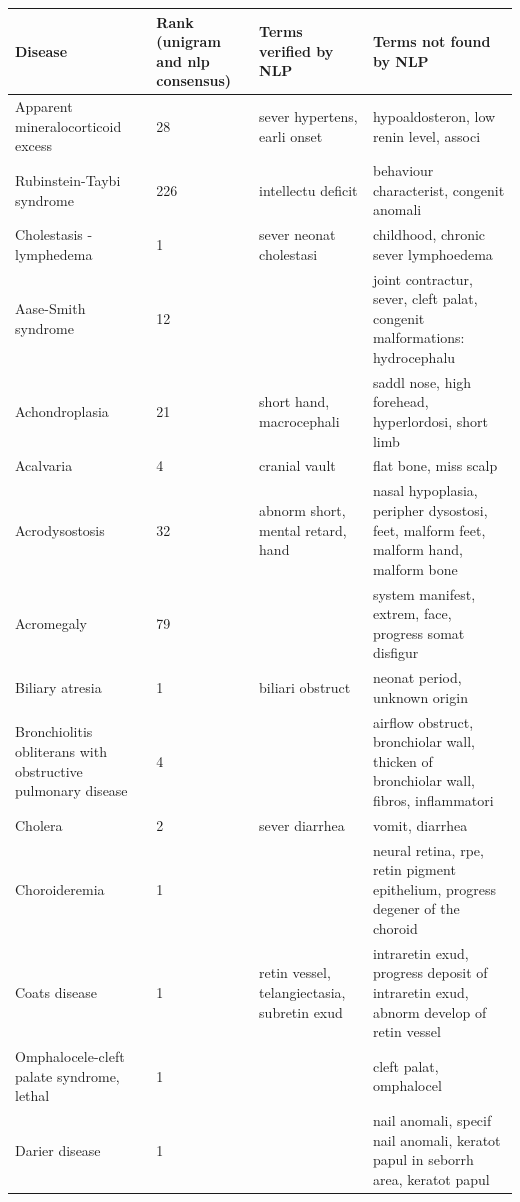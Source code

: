 \documentclass[10pt,letterpaper,final]{article}
\begin{document}
\begin{center}
\begin{small}
	\begin{longtable}{|p{3.5cm}|p{1.5cm}|p{3cm}|p{3cm}|}
	\hline
	\textbf{Disease}  & \textbf{Rank (unigram and nlp consensus)} & \textbf{Terms verified by NLP}  & \textbf{Terms not found by NLP} \\
	\hline\hline
Apparent mineralocorticoid excess & 28 & sever hypertens, earli onset & hypoaldosteron, low renin level, associ \\ \hline
Rubinstein-Taybi syndrome & 226 & intellectu deficit & behaviour characterist, congenit anomali \\ \hline
Cholestasis - lymphedema & 1 & sever neonat cholestasi &  childhood, chronic sever lymphoedema \\ \hline
Aase-Smith syndrome & 12 &   & joint contractur, sever, cleft palat, congenit malformations: hydrocephalu \\ \hline
Achondroplasia & 21 & short hand, macrocephali & saddl nose, high forehead, hyperlordosi, short limb \\ \hline
Acalvaria & 4 & cranial vault &  flat bone, miss scalp \\ \hline
Acrodysostosis & 32 & abnorm short, mental retard, hand & nasal hypoplasia, peripher dysostosi, feet, malform feet, malform hand, malform bone \\ \hline
Acromegaly & 79 &  & system manifest, extrem, face, progress somat disfigur \\ \hline
Biliary atresia & 1 & biliari obstruct &  neonat period, unknown origin \\ \hline
Bronchiolitis obliterans with obstructive pulmonary disease & 4 &  &  airflow obstruct, bronchiolar wall, thicken of bronchiolar wall, fibros, inflammatori \\ \hline
Cholera & 2 & sever diarrhea &  vomit, diarrhea  \\ \hline
Choroideremia & 1 &  &  neural retina, rpe, retin pigment epithelium, progress degener of the choroid \\ \hline
Coats disease & 1 & retin vessel, telangiectasia, subretin exud &  intraretin exud, progress deposit of intraretin exud, abnorm develop of retin vessel \\ \hline
Omphalocele-cleft palate syndrome, lethal & 1 &  &  cleft palat, omphalocel \\ \hline
Darier disease & 1 &  &  nail anomali, specif nail anomali, keratot papul in seborrh area, keratot papul \\ \hline

\end{longtable}
\end{small}
\end{center}
\end{document}
